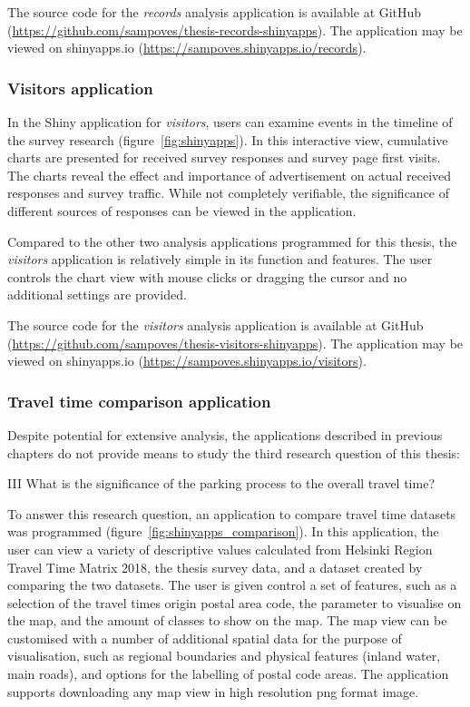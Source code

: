 The source code for the \textit{records} analysis application is available at GitHub (\textcolor{blue}{\url{https://github.com/sampoves/thesis-records-shinyapps}}). The application may be viewed on shinyapps.io (\textcolor{blue}{\url{https://sampoves.shinyapps.io/records}}).

\subsubsection{Visitors application}

In the Shiny application for \textit{visitors}, users can examine events in the timeline of the survey research (figure~\ref{fig:shinyapps}). In this interactive view, cumulative charts are presented for received survey responses and survey page first visits. The charts reveal the effect and importance of advertisement on actual received responses and survey traffic. While not completely verifiable, the significance of different sources of responses can be viewed in the application.

Compared to the other two analysis applications programmed for this thesis, the \textit{visitors} application is relatively simple in its function and features. The user controls the chart view with mouse clicks or dragging the cursor and no additional settings are provided.

The source code for the \textit{visitors} analysis application is available at GitHub (\textcolor{blue}{\url{https://github.com/sampoves/thesis-visitors-shinyapps}}). The application may be viewed on shinyapps.io (\textcolor{blue}{\url{https://sampoves.shinyapps.io/visitors}}).

\subsubsection{Travel time comparison application}

Despite potential for extensive analysis, the applications described in previous chapters do not provide means to study the third research question of this thesis:

\begin{displayquote}
    III What is the significance of the parking process to the overall travel time?
\end{displayquote}

To answer this research question, an application to compare travel time datasets was programmed (figure~\ref{fig:shinyapps_comparison}). In this application, the user can view a variety of descriptive values calculated from Helsinki Region Travel Time Matrix 2018, the thesis survey data, and a dataset created by comparing the two datasets. The user is given control a set of features, such as a selection of the travel times origin postal area code, the parameter to visualise on the map, and the amount of classes to show on the map. The map view can be customised with a number of additional spatial data for the purpose of visualisation, such as regional boundaries and physical features (inland water, main roads), and options for the labelling of postal code areas. The application supports downloading any map view in high resolution png format image.

